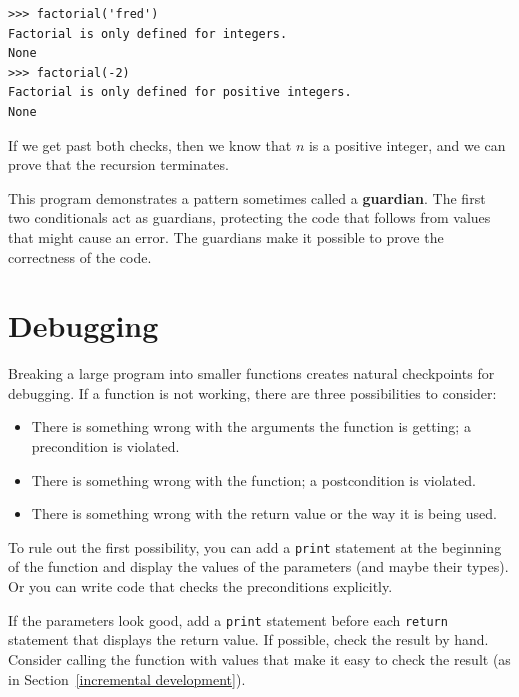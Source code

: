 \documentclass[10pt]{book}
\begin{document}
\beforeverb
\begin{verbatim}
>>> factorial('fred')
Factorial is only defined for integers.
None
>>> factorial(-2)
Factorial is only defined for positive integers.
None
\end{verbatim}
\afterverb
%
If we get past both checks, then we know that $n$ is a positive
integer, and we can prove that the recursion terminates.


This program demonstrates a pattern sometimes called a {\bf guardian}.
The first two conditionals act as guardians, protecting the code that
follows from values that might cause an error.  The guardians make it
possible to prove the correctness of the code.


\section{Debugging}
\label{factdebug}


Breaking a large program into smaller functions creates natural
checkpoints for debugging.  If a function is not working, there are
three possibilities to consider:

\begin{itemize}

\item There is something wrong with the arguments the function
is getting; a precondition is violated.

\item There is something wrong with the function; a postcondition
is violated.

\item There is something wrong with the return value or the
way it is being used.

\end{itemize}

To rule out the first possibility, you can add a {\tt print} statement
at the beginning of the function and display the values of the
parameters (and maybe their types).  Or you can write code
that checks the preconditions explicitly.


If the parameters look good, add a {\tt print} statement before each
{\tt return} statement that displays the return value.  If
possible, check the result by hand.  Consider calling the
function with values that make it easy to check the result
(as in Section~\ref{incremental development}).
\end{document}
